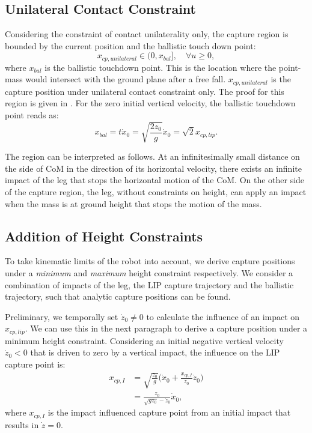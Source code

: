 \documentclass[letterpaper, 10 pt, conference]{ieeeconf}  %
\begin{document}
\subsection{Unilateral Contact Constraint}
 Considering the constraint of contact unilaterality only, the capture region is bounded by the current position and the ballistic touch down point:
\begin{equation}
	x_{cp,unilateral} \in (0, x_{bal}], \quad \forall u \geq 0, 
	\label{eq:xcpuni}
\end{equation}
where $x_{bal}$ is the ballistic touchdown point. This is the location where the point-mass would intersect with the ground plane after a free fall. $x_{cp,unilateral}$ is the capture position under unilateral contact constraint only. The proof for this region is given in \cite{koolen2016balance}. For the zero initial vertical velocity, the ballistic touchdown point reads as:
\begin{equation}
 x_{bal}=t \dot{x}_0=\sqrt{\frac{2z_0}{g}}\dot{x}_0=\sqrt{2}x_{cp,lip}.
 	\label{eq:xbal}
\end{equation}

The region can be interpreted as follows. At an infinitesimally small distance on the side of CoM in the direction of its horizontal velocity, there exists an infinite impact of the leg that stops the horizontal motion of the CoM. On the other side of the capture region, the leg, without constraints on height, can apply an impact when the mass is at ground height that stops the motion of the mass.
\subsection{Addition of Height Constraints}
To take kinematic limits of the robot into account, we derive capture positions under a \textit{minimum} and \textit{maximum} height constraint respectively. We consider a combination of impacts of the leg, the LIP capture trajectory and the ballistic trajectory, such that analytic capture positions can be found. 

Preliminary, we temporally set $\dot{z}_0 \neq 0$ to calculate the influence of an impact on $x_{cp,lip}$. We can use this in the next paragraph to derive a capture position under a minimum height constraint. Considering an initial negative vertical velocity $\dot{z}_0<0$ that is driven to zero by a vertical impact, the influence on the LIP capture point is:
\begin{align}
	x_{cp,I} &= \sqrt{\frac{z_0}{g}}\Big(\dot{x}_0 + \frac{x_{cp,I}}{z_0}\dot{z}_0\Big)\\
	&=\frac{z_0}{\sqrt{gz_0}-\dot{z}_0}\dot{x}_0, \label{eq:xcpimpact}
\end{align}
where $x_{cp,I}$ is the impact influenced capture point from an initial impact that results in $\dot{z}=0$.
\end{document}
